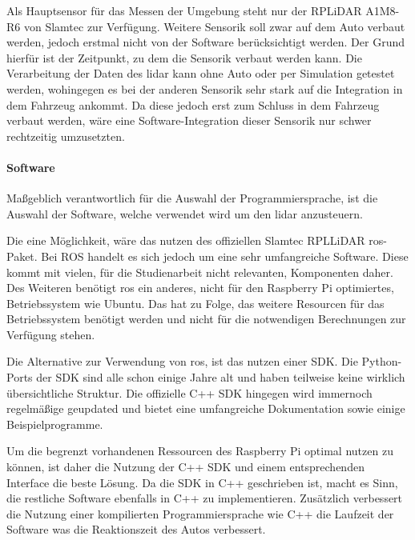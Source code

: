 Als Hauptsensor für das Messen der Umgebung steht nur der RPLiDAR A1M8-R6 von Slamtec zur Verfügung.
Weitere Sensorik soll zwar auf dem Auto verbaut werden, jedoch erstmal nicht von der Software berücksichtigt werden.
Der Grund hierfür ist der Zeitpunkt, zu dem die Sensorik verbaut werden kann.
Die Verarbeitung der Daten des \ac{lidar} kann ohne Auto oder per Simulation getestet werden, wohingegen es bei der anderen Sensorik sehr stark auf die Integration in dem Fahrzeug ankommt.
Da diese jedoch erst zum Schluss in dem Fahrzeug verbaut werden, wäre eine Software-Integration dieser Sensorik nur schwer rechtzeitig umzusetzten.

\paragraph{Software}
Maßgeblich verantwortlich für die Auswahl der Programmiersprache, ist die Auswahl der Software, welche verwendet wird um den \ac{lidar} anzusteuern.

Die eine Möglichkeit, wäre das nutzen des offiziellen Slamtec RPLLiDAR \ac{ros}-Paket.
Bei ROS handelt es sich jedoch um eine sehr umfangreiche Software. 
Diese kommt mit vielen, für die Studienarbeit nicht relevanten, Komponenten daher.
Des Weiteren benötigt \ac{ros} ein anderes, nicht für den Raspberry Pi optimiertes, Betriebssystem wie Ubuntu.
Das hat zu Folge, das weitere Resourcen für das Betriebssystem benötigt werden und nicht für die notwendigen Berechnungen zur Verfügung stehen.

Die Alternative zur Verwendung von \ac{ros}, ist das nutzen einer SDK.
Die Python-Ports der SDK sind alle schon einige Jahre alt und haben teilweise keine wirklich übersichtliche Struktur.
Die offizielle C++ SDK hingegen wird immernoch regelmäßige geupdated und bietet eine umfangreiche Dokumentation sowie einige Beispielprogramme.

Um die begrenzt vorhandenen Ressourcen des Raspberry Pi optimal nutzen zu können, ist daher die Nutzung der C++ SDK und einem entsprechenden Interface die beste Lösung.
Da die SDK in C++ geschrieben ist, macht es Sinn, die restliche Software ebenfalls in C++ zu implementieren.
Zusätzlich verbessert die Nutzung einer kompilierten Programmiersprache wie C++ die Laufzeit der Software was die Reaktionszeit des Autos verbessert.

\newpage
